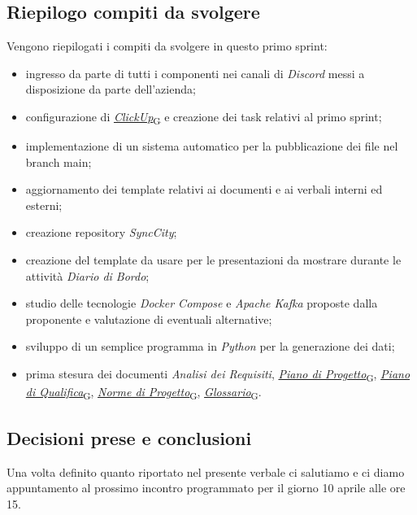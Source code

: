 \documentclass[italian,12pt]{article}
\begin{document}
\subsection{Riepilogo compiti da svolgere}
Vengono riepilogati i compiti da svolgere in questo primo sprint:
\begin{itemize}
	\item ingresso da parte di tutti i componenti nei canali di \textit{Discord} messi a disposizione da parte dell'azienda;
	\item configurazione di \href{https://7last.github.io/docs/rtb/documentazione-interna/glossario\#clickup}{\textit{ClickUp}\textsubscript{G}} e creazione dei task relativi al primo sprint;
	\item implementazione di un sistema automatico per la pubblicazione dei file nel branch main;
	\item aggiornamento dei template relativi ai documenti e ai verbali interni ed esterni;
	\item creazione repository \textit{SyncCity};
	\item creazione del template da usare per le presentazioni da mostrare durante le attività \textit{Diario di Bordo};
	\item studio delle tecnologie \textit{Docker Compose} e \textit{Apache Kafka} proposte dalla proponente e valutazione di eventuali alternative;
	\item sviluppo di un semplice programma in \textit{Python} per la generazione dei dati;
	\item prima stesura dei documenti \textit{Analisi dei Requisiti}, \href{https://7last.github.io/docs/rtb/documentazione-interna/glossario\#piano-di-progetto}{\textit{Piano di Progetto}\textsubscript{G}}, \href{https://7last.github.io/docs/rtb/documentazione-interna/glossario\#piano-di-qualifica}{\textit{Piano di Qualifica}\textsubscript{G}}, \href{https://7last.github.io/docs/rtb/documentazione-interna/glossario\#norme-di-progetto}{\textit{Norme di Progetto}\textsubscript{G}}, \href{https://7last.github.io/docs/rtb/documentazione-interna/glossario\#glossario}{\textit{Glossario}\textsubscript{G}}.
\end{itemize}

\subsection{Decisioni prese e conclusioni}
Una volta definito quanto riportato nel presente verbale ci salutiamo e ci diamo appuntamento al prossimo incontro programmato 
per il giorno 10 aprile alle ore 15.
\end{document}
